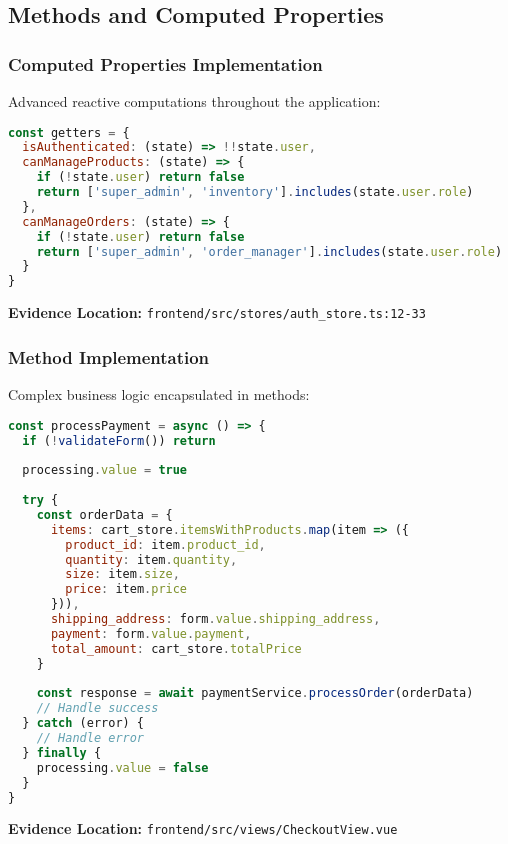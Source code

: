 \documentclass[12pt,a4paper]{article}
\begin{document}
\subsection{Methods and Computed Properties}

\subsubsection{Computed Properties Implementation}
Advanced reactive computations throughout the application:

\begin{lstlisting}[language=javascript, caption=Authentication State Management]
const getters = {
  isAuthenticated: (state) => !!state.user,
  canManageProducts: (state) => {
    if (!state.user) return false
    return ['super_admin', 'inventory'].includes(state.user.role)
  },
  canManageOrders: (state) => {
    if (!state.user) return false
    return ['super_admin', 'order_manager'].includes(state.user.role)
  }
}
\end{lstlisting}

\textbf{Evidence Location:} \texttt{frontend/src/stores/auth\_store.ts:12-33}

\subsubsection{Method Implementation}
Complex business logic encapsulated in methods:

\begin{lstlisting}[language=javascript, caption=Payment Processing Method]
const processPayment = async () => {
  if (!validateForm()) return
  
  processing.value = true
  
  try {
    const orderData = {
      items: cart_store.itemsWithProducts.map(item => ({
        product_id: item.product_id,
        quantity: item.quantity,
        size: item.size,
        price: item.price
      })),
      shipping_address: form.value.shipping_address,
      payment: form.value.payment,
      total_amount: cart_store.totalPrice
    }
    
    const response = await paymentService.processOrder(orderData)
    // Handle success
  } catch (error) {
    // Handle error
  } finally {
    processing.value = false
  }
}
\end{lstlisting}

\textbf{Evidence Location:} \texttt{frontend/src/views/CheckoutView.vue}
\end{document}
